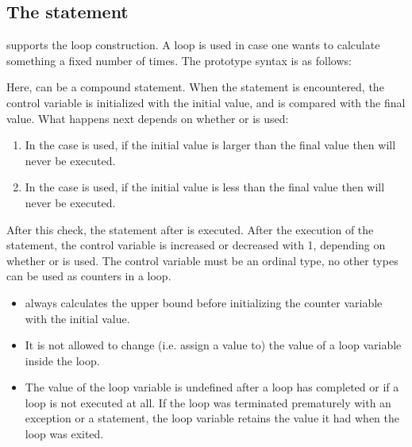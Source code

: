 \subsection{The  statement}
\fpc supports the  loop construction. A  loop is used in case
one wants to calculate something a fixed number of times.
The prototype syntax is as follows:

Here,  can be a compound statement.
When the  statement is encountered, the control variable is initialized with
the initial value, and is compared with the final value.
What happens next depends on whether  or  is used:
\begin{enumerate}
\item In the case  is used, if the initial value is larger than the final
value then  will never be executed.
\item In the case  is used, if the initial value is less than the final
value then  will never be executed.
\end{enumerate}
After this check, the statement after  is executed. After the
execution of the statement, the control variable is increased or decreased
with 1, depending on whether  or  is used.
The control variable must be an ordinal type, no other
types can be used as counters in a loop.

\begin{remark}
\begin{itemize}
\item \fpc always calculates the upper bound before initializing
the counter variable with the initial value.

\item It is not allowed to change (i.e. assign a value to) the value of a 
loop variable inside the loop.

\item The value of the loop variable is undefined after a loop has
completed or if a loop is not executed at all. If the loop was terminated prematurely with an exception or a
 statement, the loop variable retains the value it had when the
loop was exited.

\end{itemize}
\end{remark}


